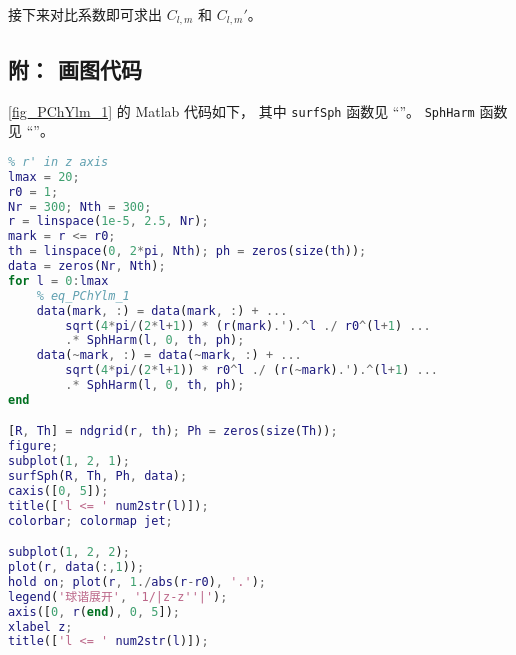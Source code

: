 接下来对比系数即可求出 $C_{l,m}$ 和 $C_{l,m}'$。

\subsection{附： 画图代码}
\autoref{fig_PChYlm_1} 的 Matlab 代码如下， 其中 \verb|surfSph| 函数见 “”。 \verb|SphHarm| 函数见 “”。
\begin{lstlisting}[language=matlab, caption=Ylm\_Coul\_exp.m]
% expansion of 1/|r-r'| into Y_lm
% r' in z axis
lmax = 20;
r0 = 1;
Nr = 300; Nth = 300;
r = linspace(1e-5, 2.5, Nr);
mark = r <= r0;
th = linspace(0, 2*pi, Nth); ph = zeros(size(th));
data = zeros(Nr, Nth);
for l = 0:lmax
    % eq_PChYlm_1
    data(mark, :) = data(mark, :) + ...
        sqrt(4*pi/(2*l+1)) * (r(mark).').^l ./ r0^(l+1) ...
        .* SphHarm(l, 0, th, ph);
    data(~mark, :) = data(~mark, :) + ...
        sqrt(4*pi/(2*l+1)) * r0^l ./ (r(~mark).').^(l+1) ...
        .* SphHarm(l, 0, th, ph);
end

[R, Th] = ndgrid(r, th); Ph = zeros(size(Th));
figure;
subplot(1, 2, 1);
surfSph(R, Th, Ph, data);
caxis([0, 5]);
title(['l <= ' num2str(l)]);
colorbar; colormap jet;

subplot(1, 2, 2);
plot(r, data(:,1));
hold on; plot(r, 1./abs(r-r0), '.');
legend('球谐展开', '1/|z-z''|');
axis([0, r(end), 0, 5]);
xlabel z;
title(['l <= ' num2str(l)]);
\end{lstlisting}
